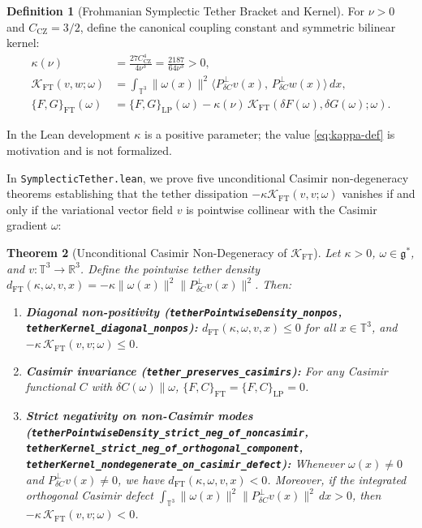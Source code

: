 \documentclass[11pt,a4paper]{article}
\newtheorem{theorem}{Theorem}[section]
\theoremstyle{definition}
\newtheorem{definition}[theorem]{Definition}
\begin{document}
\begin{definition}[Frohmanian Symplectic Tether Bracket and Kernel]
For $\nu > 0$ and $C_{\mathrm{CZ}} = 3/2$, define the canonical coupling constant and symmetric bilinear kernel:
\begin{align}
  \kappa(\nu) &= \frac{27 C_{\mathrm{CZ}}^4}{4 \nu^3} = \frac{2187}{64 \nu^3} > 0, \label{eq:kappa-def}\\
  \mathcal{K}_{\mathrm{FT}}(v, w; \omega) &= \int_{\mathbb{T}^3} \|\omega(x)\|^2 \bigl\langle P_{\delta C}^\perp v(x),\, P_{\delta C}^\perp w(x) \bigr\rangle\,dx, \label{eq:kernel-def}\\
  \{F, G\}_{\mathrm{FT}}(\omega) &= \{F, G\}_{\mathrm{LP}}(\omega) - \kappa(\nu)\,\mathcal{K}_{\mathrm{FT}}(\delta F(\omega), \delta G(\omega); \omega). \label{eq:bracket-def}
\end{align}
\end{definition}
In the Lean development $\kappa$ is a positive parameter; the value \eqref{eq:kappa-def} is motivation and is not formalized.


In \texttt{SymplecticTether.lean}, we prove five unconditional Casimir non-degeneracy theorems establishing that the tether dissipation $-\kappa \mathcal{K}_{\mathrm{FT}}(v, v; \omega)$ vanishes if and only if the variational vector field $v$ is pointwise collinear with the Casimir gradient $\omega$:

\begin{theorem}[Unconditional Casimir Non-Degeneracy of $\mathcal{K}_{\mathrm{FT}}$]
Let $\kappa > 0$, $\omega \in \mathfrak{g}^*$, and $v : \mathbb{T}^3 \to \mathbb{R}^3$. Define the pointwise tether density $d_{\mathrm{FT}}(\kappa, \omega, v, x) = -\kappa \|\omega(x)\|^2 \|P_{\delta C}^\perp v(x)\|^2$. Then:
\begin{enumerate}
  \item \textbf{Diagonal non-positivity (\texttt{tetherPointwiseDensity\_nonpos}, \texttt{tetherKernel\_diagonal\_nonpos}):} $d_{\mathrm{FT}}(\kappa, \omega, v, x) \le 0$ for all $x \in \mathbb{T}^3$, and $-\kappa\,\mathcal{K}_{\mathrm{FT}}(v, v; \omega) \le 0$.
  \item \textbf{Casimir invariance (\texttt{tether\_preserves\_casimirs}):} For any Casimir functional $C$ with $\delta C(\omega) \parallel \omega$, $\{F, C\}_{\mathrm{FT}} = \{F, C\}_{\mathrm{LP}} = 0$.
  \item \textbf{Strict negativity on non-Casimir modes (\texttt{tetherPointwiseDensity\_strict\_neg\_of\_noncasimir}, \texttt{tetherKernel\_strict\_neg\_of\_orthogonal\_component}, \texttt{tetherKernel\_nondegenerate\_on\_casimir\_defect}):} Whenever $\omega(x) \neq 0$ and $P_{\delta C}^\perp v(x) \neq 0$, we have $d_{\mathrm{FT}}(\kappa, \omega, v, x) < 0$. Moreover, if the integrated orthogonal Casimir defect $\int_{\mathbb{T}^3} \|\omega(x)\|^2 \|P_{\delta C}^\perp v(x)\|^2\,dx > 0$, then $-\kappa\,\mathcal{K}_{\mathrm{FT}}(v, v; \omega) < 0$.
\end{enumerate}
\end{theorem}
\end{document}
